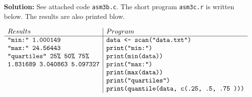 \documentclass[11pt]{article} %
\begin{document}
\begin{enumerate}
{\bf Solution:} See attached code \texttt{asm3b.c}.  The short program \texttt{asm3c.r} is written below.  The results are also printed blow.

$\begin{array}{l   |  l}
Results & Program \\\hline
\texttt{"min:" 1.000149} & \texttt{data <- scan("data.txt")}\\

\texttt{"max:" 24.56443}&\texttt{print("min:")}\\

\texttt{"quartiles"     25\%      50\%      75\% }& \texttt{print(min(data))}\\
\texttt{1.831689 3.040863 5.097327}&\texttt{print("max:")}\\

 & \texttt{print(max(data))}\\

&\texttt{print("quartiles")}\\

&\texttt{print(quantile(data, c(.25, .5, .75	)))}\end{array}$

\end{enumerate}
\end{document}
